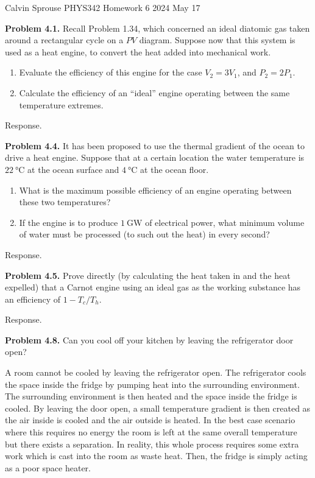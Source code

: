 \documentclass[a4paper, 12pt]{config/homework}
\begin{document}
\noindent
Calvin Sprouse \hfill PHYS342 Homework 6 \hfill 2024 May 17

\bigskip
\noindent
\textbf{Problem 4.1.} Recall Problem 1.34, which concerned an ideal diatomic gas taken around a rectangular cycle on a \(PV\) diagram. Suppose now that this system is used as a heat engine, to convert the heat added into mechanical work.
\begin{enumerate}[label=\textbf{(\alph*)}]
\item Evaluate the efficiency of this engine for the case \(V_2 = 3V_1\), and \(P_2 = 2P_1\).
\item Calculate the efficiency of an ``ideal'' engine operating between the same temperature extremes.
\end{enumerate}
\noindent
Response.

\pagebreak
\noindent
\textbf{Problem 4.4.} It has been proposed to use the thermal gradient of the ocean to drive a heat engine. Suppose that at a certain location the water temperature is \(\qty{22}{\celsius}\) at the ocean surface and \(\qty{4}{\celsius}\) at the ocean floor.
\begin{enumerate}[label=\textbf{(\alph*)}]
\item What is the maximum possible efficiency of an engine operating between these two temperatures?
\item If the engine is to produce \(\qty{1}{\giga\watt}\) of electrical power, what minimum volume of water must be processed (to such out the heat) in every second?
\end{enumerate}
\noindent
Response.

\pagebreak
\noindent
\textbf{Problem 4.5.} Prove directly (by calculating the heat taken in and the heat expelled) that a Carnot engine using an ideal gas as the working substance has an efficiency of \(1 - T_c/T_h\).

\noindent
Response.

\pagebreak
\noindent
\textbf{Problem 4.8.} Can you cool off your kitchen by leaving the refrigerator door open?

\noindent
A room cannot be cooled by leaving the refrigerator open. The refrigerator cools the space inside the fridge by pumping heat into the surrounding environment. The surrounding environment is then heated and the space inside the fridge is cooled. By leaving the door open, a small temperature gradient is then created as the air inside is cooled and the air outside is heated. In the best case scenario where this requires no energy the room is left at the same overall temperature but there exists a separation. In reality, this whole process requires some extra work which is cast into the room as waste heat. Then, the fridge is simply acting as a poor space heater.
\end{document}
